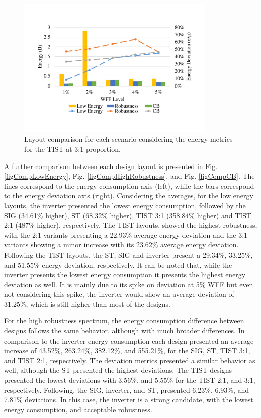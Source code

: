 \documentclass[diss,pgmicro,english]{iiufrgs}
\begin{document}
    \begin{figure}[H]
        \centering
            \includegraphics[width=0.85\textwidth, trim={1.25cm 3cm 2cm 3cm}, clip]{comp3Ltist312Energy.pdf}
            \caption{Layout comparison for each scenario considering the energy metrics for the TIST at 3:1 proportion.}
        \label{figscCompTIST31}
    \end{figure}

A further comparison between each design layout is presented in Fig. \ref{figCompLowEnergy}, Fig. \ref{figCompHighRobustness}, and Fig. \ref{figCompCB}. The lines correspond to the energy consumption axis (left), while the bars correspond to the energy deviation axis (right). Considering the averages, for the low energy layouts, the inverter presented the lowest energy consumption, followed by the SIG (34.61\% higher), ST (68.32\% higher), TIST 3:1 (358.84\% higher) and TIST 2:1 (487\% higher), respectively. The TIST layouts, showed the highest robustness, with the 2:1 variants presenting a 22.93\% average energy deviation and the 3:1 variants showing a minor increase with its 23.62\% average energy deviation. Following the TIST layouts, the ST, SIG and inverter present a 29.34\%, 33.25\%, and 51.55\% energy deviation, respectively. It can be noted that, while the inverter presents the lowest energy consumption it presents the highest energy deviation as well. It is mainly due to its spike on deviation at 5\% WFF but even not considering this spike, the inverter would show an average deviation of 31.25\%, which is still higher than most of the designs.

    For the high robustness spectrum, the energy consumption difference between designs follows the same behavior, although with much broader differences. In comparison to the inverter energy consumption each design presented an average increase of 43.52\%, 263.24\%, 382.12\%, and 555.21\%, for the SIG, ST, TIST 3:1, and TIST 2:1, respectively. The deviation metrics presented a similar behavior as well, although the ST presented the highest deviations. The TIST designs presented the lowest deviations with 3.56\%, and 5.55\% for the TIST 2:1, and 3:1, respectively. Following, the SIG, inverter, and ST, presented 6.23\%, 6.93\%, and 7.81\% deviations. In this case, the inverter is a strong candidate, with the lowest energy consumption, and acceptable robustness.
\end{document}
